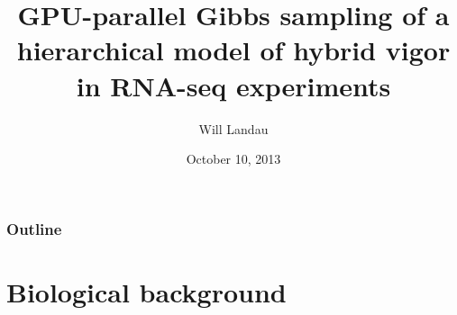 \documentclass[handout]{beamer}
\title{GPU-parallel Gibbs sampling of a hierarchical model of hybrid vigor in RNA-seq experiments}
\author{Will Landau}
\date{October 10, 2013}
\institute{Iowa State University}
\numberwithin{equation}{section}
\begin{document}
\setcounter{subsection}{1}
\begin{frame}
\titlepage
 \end{frame}
 
\begin{frame}
\frametitle{Outline}
\tableofcontents
\end{frame}




\section{Biological background}









\end{document}
